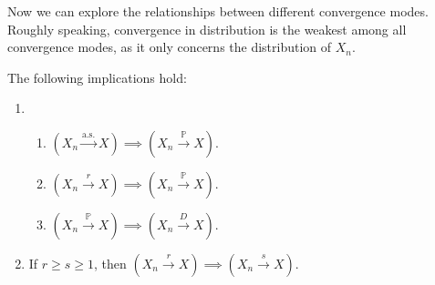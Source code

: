 \documentclass{huhtakm-template-book-v2}
\newcommand{\prob}{\mathbb{P}}
\begin{document}
    Now we can explore the relationships between different convergence modes.
    Roughly speaking, convergence in distribution is the weakest among all convergence modes, as it only concerns the distribution of $X_{n}$.
    \begin{thm}
        \label{Chapter 8 (Theorem) implications of different convergence modes}
        The following implications hold:
        \begin{enumerate}
            \item \begin{enumerate}
                \item $(X_{n} \xrightarrow{\text{a.s.}} X) \implies (X_{n} \xrightarrow{\prob} X)$.
                \item $(X_{n} \xrightarrow{r} X) \implies (X_{n} \xrightarrow{\prob} X)$.
                \item $(X_{n} \xrightarrow{\prob} X) \implies (X_{n} \xrightarrow{D} X)$.
            \end{enumerate}
            \item If $r \geq s \geq 1$, then $(X_{n} \xrightarrow{r} X) \implies (X_{n} \xrightarrow{s} X)$.
        \end{enumerate}
    \end{thm}
\end{document}
